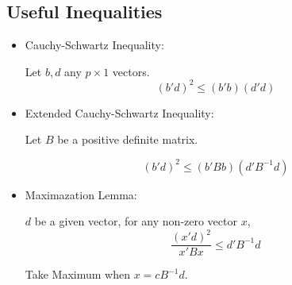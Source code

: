     \subsection{Useful Inequalities}
    \begin{itemize}[topsep=6pt,itemsep=4pt]
        \item Cauchy-Schwartz Inequality:
        
        Let $ b,d$ any $ p\times 1 $ vectors.
        \begin{equation}
            (b'd)^2\leq (b'b)(d'd) 
        \end{equation}
        
        \item Extended Cauchy-Schwartz Inequality: 
        
        Let $ B $ be a positive definite matrix.
        
        \begin{equation}
            (b'd)^2\leq(b'Bb)(d'B^{-1}d) 
        \end{equation}
        
        \item Maximazation Lemma:
        
        $ d $ be a given vector, for any non-zero vector $ x $,
        \begin{equation}
            \dfrac{(x'd)^2}{x'Bx}\leq d'B^{-1}d 
        \end{equation}

        Take Maximum when $ x=cB^{-1}d $.
        
        
    \end{itemize}

        

